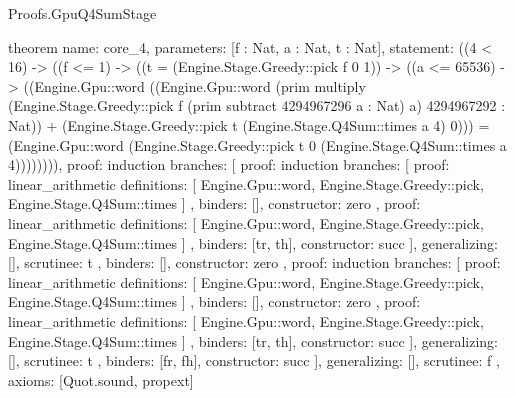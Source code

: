 \begin{lexlean}{Proofs.GpuQ4SumStage}
\begin{semanticmodule}
theorem{
  name: core_4,
  parameters: [f : Nat, a : Nat, t : Nat],
  statement: ((4 < 16) -> ((f <= 1) -> ((t = (Engine.Stage.Greedy::pick f 0 1)) -> ((a <= 65536) -> ((Engine.Gpu::word ((Engine.Gpu::word (prim multiply (Engine.Stage.Greedy::pick f (prim subtract 4294967296 a : Nat) a) 4294967292 : Nat)) + (Engine.Stage.Greedy::pick t (Engine.Stage.Q4Sum::times a 4) 0))) = (Engine.Gpu::word (Engine.Stage.Greedy::pick t 0 (Engine.Stage.Q4Sum::times a 4)))))))),
  proof: induction{
    branches: [
      {
        proof: induction{
          branches: [
            {
              proof: linear_arithmetic{
                definitions: [
                  Engine.Gpu::word,
                  Engine.Stage.Greedy::pick,
                  Engine.Stage.Q4Sum::times
                ]
              },
              binders: [],
              constructor: zero
            },
            {
              proof: linear_arithmetic{
                definitions: [
                  Engine.Gpu::word,
                  Engine.Stage.Greedy::pick,
                  Engine.Stage.Q4Sum::times
                ]
              },
              binders: [tr, th],
              constructor: succ
            }
          ],
          generalizing: [],
          scrutinee: t
        },
        binders: [],
        constructor: zero
      },
      {
        proof: induction{
          branches: [
            {
              proof: linear_arithmetic{
                definitions: [
                  Engine.Gpu::word,
                  Engine.Stage.Greedy::pick,
                  Engine.Stage.Q4Sum::times
                ]
              },
              binders: [],
              constructor: zero
            },
            {
              proof: linear_arithmetic{
                definitions: [
                  Engine.Gpu::word,
                  Engine.Stage.Greedy::pick,
                  Engine.Stage.Q4Sum::times
                ]
              },
              binders: [tr, th],
              constructor: succ
            }
          ],
          generalizing: [],
          scrutinee: t
        },
        binders: [fr, fh],
        constructor: succ
      }
    ],
    generalizing: [],
    scrutinee: f
  },
  axioms: [Quot.sound, propext]
}


\end{semanticmodule}
\end{lexlean}

